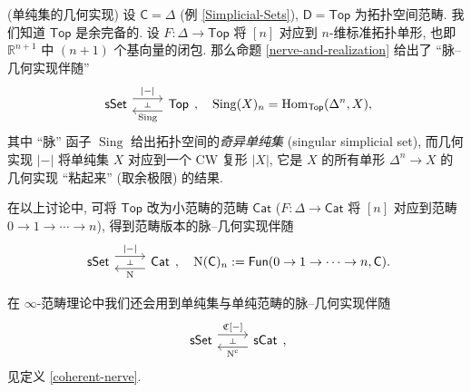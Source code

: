 \begin{example}
	[label={sset-geometric-realization}]
	{(单纯集的几何实现)}
	设 $\mathsf C = \Delta$ (例 \ref{Simplicial-Sets}),
	$\mathsf D=\mathsf {Top}$ 为拓扑空间范畴.
	我们知道 $\mathsf {Top}$ 是余完备的.
	设 $F \colon \Delta \to \mathsf {Top}$ 将 $[n]$ 对应到 $n$-维标准拓扑单形, 也即 $\mathbb{R}^{n+1}$ 中 $(n+1)$ 个基向量的闭包.
	那么命题 \ref{nerve-and-realization} 给出了 ``脉--几何实现伴随''
	\[\begin{tikzcd}[ampersand replacement=\&]
		{\mathsf {sSet}} \& {\mathsf {Top}}
		\arrow[""{name=0, anchor=center, inner sep=0}, "|{-}|", shift left=2, from=1-1, to=1-2]
		\arrow[""{name=1, anchor=center, inner sep=0}, "\operatorname{Sing}", shift left=2, from=1-2, to=1-1]
		\arrow["\dashv"{anchor=center, rotate=-90}, draw=none, from=0, to=1]
	\end{tikzcd},\quad
	\operatorname{Sing}(X)_n = \operatorname{Hom}_{\mathsf {Top}}(\Delta^n,X),\]
	其中 ``脉'' 函子 $\operatorname{Sing}$ 给出拓扑空间的\emph{奇异单纯集} (singular simplicial set), 而几何实现 $|{-}|$ 将单纯集 $X$ 对应到一个 CW 复形 $|X|$, 它是 $X$ 的所有单形 $\Delta^n\to X$ 的几何实现 ``粘起来'' (取余极限) 的结果.
	
	在以上讨论中, 可将 $\mathsf {Top}$ 改为小范畴的范畴 $\mathsf {Cat}$ ($F\colon \Delta \to \mathsf {Cat}$ 将 $[n]$ 对应到范畴 $0 \to 1 \to \cdots \to n$), 得到范畴版本的脉--几何实现伴随
	\[\begin{tikzcd}[ampersand replacement=\&]
		{\mathsf {sSet}} \& {\mathsf {Cat}}
		\arrow[""{name=0, anchor=center, inner sep=0}, "|{-}|", shift left=2, from=1-1, to=1-2]
		\arrow[""{name=1, anchor=center, inner sep=0}, "\operatorname{N}", shift left=2, from=1-2, to=1-1]
		\arrow["\dashv"{anchor=center, rotate=-90}, draw=none, from=0, to=1]
	\end{tikzcd},\quad
	\operatorname{N}(\mathsf C)_n := \mathsf {Fun}(0\to 1\to\cdots\to n,\mathsf C).
	\]
	
	在 $\infty$-范畴理论中我们还会用到单纯集与单纯范畴的脉--几何实现伴随
	\[
	\begin{tikzcd}[ampersand replacement=\&]
			{\mathsf {sSet}} \& {\mathsf {sCat}}
			\arrow[""{name=0, anchor=center, inner sep=0}, "{\mathfrak {C}[{-}]}", shift left=2, from=1-1, to=1-2]
			\arrow[""{name=1, anchor=center, inner sep=0}, "{\operatorname{N}^{\text{c}}}", shift left=2, from=1-2, to=1-1]
			\arrow["\dashv"{anchor=center, rotate=-90}, draw=none, from=0, to=1]
	\end{tikzcd},
	\]
	见定义 \ref{coherent-nerve}.
\end{example}


